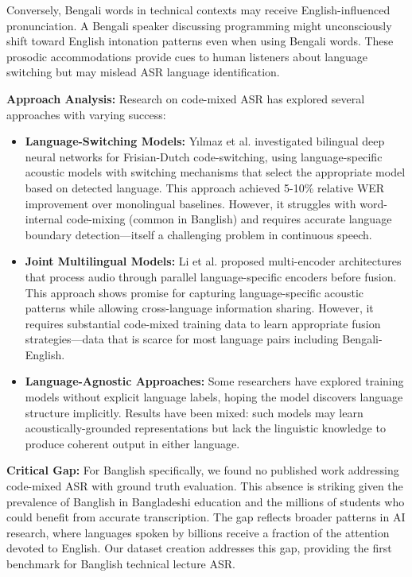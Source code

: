 Conversely, Bengali words in technical contexts may receive English-influenced pronunciation. A Bengali speaker discussing programming might unconsciously shift toward English intonation patterns even when using Bengali words. These prosodic accommodations provide cues to human listeners about language switching but may mislead ASR language identification.

\textbf{Approach Analysis:} Research on code-mixed ASR has explored several approaches with varying success:

\begin{itemize}
    \item \textbf{Language-Switching Models:} Y{\i}lmaz et al. \cite{Yilmaz2016} investigated bilingual deep neural networks for Frisian-Dutch code-switching, using language-specific acoustic models with switching mechanisms that select the appropriate model based on detected language. This approach achieved 5-10\% relative WER improvement over monolingual baselines. However, it struggles with word-internal code-mixing (common in Banglish) and requires accurate language boundary detection---itself a challenging problem in continuous speech.
    
    \item \textbf{Joint Multilingual Models:} Li et al. \cite{Li2019} proposed multi-encoder architectures that process audio through parallel language-specific encoders before fusion. This approach shows promise for capturing language-specific acoustic patterns while allowing cross-language information sharing. However, it requires substantial code-mixed training data to learn appropriate fusion strategies---data that is scarce for most language pairs including Bengali-English.
    
    \item \textbf{Language-Agnostic Approaches:} Some researchers have explored training models without explicit language labels, hoping the model discovers language structure implicitly. Results have been mixed: such models may learn acoustically-grounded representations but lack the linguistic knowledge to produce coherent output in either language.
\end{itemize}

\textbf{Critical Gap:} For Banglish specifically, we found no published work addressing code-mixed ASR with ground truth evaluation. This absence is striking given the prevalence of Banglish in Bangladeshi education and the millions of students who could benefit from accurate transcription. The gap reflects broader patterns in AI research, where languages spoken by billions receive a fraction of the attention devoted to English. Our dataset creation addresses this gap, providing the first benchmark for Banglish technical lecture ASR.

